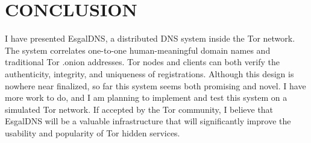 
\chapter{CONCLUSION}

I have presented EsgalDNS, a distributed DNS system inside the Tor network. The system correlates one-to-one human-meaningful domain names and traditional Tor .onion addresses. Tor nodes and clients can both verify the authenticity, integrity, and uniqueness of registrations. Although this design is nowhere near finalized, so far this system seems both promising and novel. I have more work to do, and I am planning to implement and test this system on a simulated Tor network. If accepted by the Tor community, I believe that EsgalDNS will be a valuable infrastructure that will significantly improve the usability and popularity of Tor hidden services.